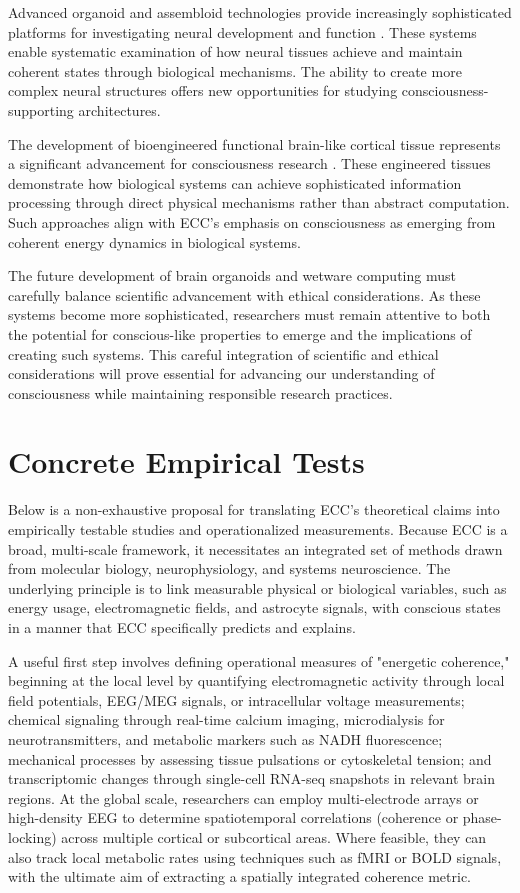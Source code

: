 \begin{refsection}
Advanced organoid and assembloid technologies provide increasingly sophisticated platforms for investigating neural development and function \cite{Saha2020}. These systems enable systematic examination of how neural tissues achieve and maintain coherent states through biological mechanisms. The ability to create more complex neural structures offers new opportunities for studying consciousness-supporting architectures.

The development of bioengineered functional brain-like cortical tissue represents a significant advancement for consciousness research \cite{TangSchomer2014}. These engineered tissues demonstrate how biological systems can achieve sophisticated information processing through direct physical mechanisms rather than abstract computation. Such approaches align with ECC's emphasis on consciousness as emerging from coherent energy dynamics in biological systems.

The future development of brain organoids and wetware computing must carefully balance scientific advancement with ethical considerations. As these systems become more sophisticated, researchers must remain attentive to both the potential for conscious-like properties to emerge and the implications of creating such systems. This careful integration of scientific and ethical considerations will prove essential for advancing our understanding of consciousness while maintaining responsible research practices.

\section{Concrete Empirical Tests}

Below is a non-exhaustive proposal for translating ECC’s theoretical claims into empirically testable studies and operationalized measurements. Because ECC is a broad, multi-scale framework, it necessitates an integrated set of methods drawn from molecular biology, neurophysiology, and systems neuroscience. The underlying principle is to link measurable physical or biological variables, such as energy usage, electromagnetic fields, and astrocyte signals, with conscious states in a manner that ECC specifically predicts and explains.

A useful first step involves defining operational measures of "energetic coherence," beginning at the local level by quantifying electromagnetic activity through local field potentials, EEG/MEG signals, or intracellular voltage measurements; chemical signaling through real-time calcium imaging, microdialysis for neurotransmitters, and metabolic markers such as NADH fluorescence; mechanical processes by assessing tissue pulsations or cytoskeletal tension; and transcriptomic changes through single-cell RNA-seq snapshots in relevant brain regions. At the global scale, researchers can employ multi-electrode arrays or high-density EEG to determine spatiotemporal correlations (coherence or phase-locking) across multiple cortical or subcortical areas. Where feasible, they can also track local metabolic rates using techniques such as fMRI or BOLD signals, with the ultimate aim of extracting a spatially integrated coherence metric.


\end{refsection}
